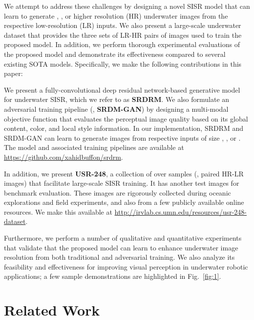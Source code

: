 \documentclass[10pt,twocolumn,letterpaper]{article}
\begin{document}
We attempt to address these challenges by designing a novel SISR model that can learn to generate , , or  higher resolution (HR) underwater images from the respective low-resolution (LR) inputs. 
We also present a large-scale underwater dataset that provides the three sets of LR-HR pairs of images used to train the proposed model.     
In addition, we perform thorough experimental evaluations of the proposed model and demonstrate its effectiveness compared to several existing SOTA models. 
Specifically, we make the following contributions in this paper: 
\begin{compactenum}[(a)]

\vspace{1mm}
\item We present a fully-convolutional deep residual network-based generative model for underwater SISR, which we refer to as \textbf{SRDRM}. 
We also formulate an adversarial training pipeline (\ie, \textbf{SRDM-GAN}) by designing a multi-modal objective function that evaluates the perceptual image quality based on its global content, color, and local style information. In our implementation, SRDRM and SRDM-GAN can learn to generate  images from respective inputs of size , , or . The model and associated training pipelines are available at \url{https://github.com/xahidbuffon/srdrm}.   

\vspace{1mm}
\item In addition, we present \textbf{USR-248}, a collection of over  samples (\ie, paired HR-LR images) that facilitate large-scale SISR training. It has another  test images for benchmark evaluation.  
These images are rigorously collected during oceanic explorations and field experiments, and also from a few publicly available online resources. We make this available at \url{http://irvlab.cs.umn.edu/resources/usr-248-dataset}.


\vspace{1mm}
\item Furthermore, we perform a number of qualitative and quantitative experiments that validate that the proposed model can learn to enhance underwater image resolution from both traditional and adversarial training.  
We also analyze its feasibility and effectiveness for improving visual perception in underwater robotic applications; a few sample demonstrations are highlighted in Fig.~\ref{fig:1}.  


\end{compactenum}
 \section{Related Work}\label{related_work}
\end{document}
